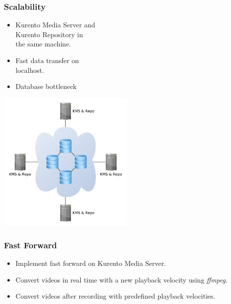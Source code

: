 \documentclass[compress]{beamer}
\begin{document}
	\begin{frame}[c]
		\frametitle{Scalability}
		\begin{itemize}
				\vfill
		\item Kurento Media Server and \\ Kurento Repository in \\the same machine. 
				\vfill
		\item Fast data transfer on \\ localhost.
				\vfill
		\item Database bottleneck
		\end{itemize}

		\begin{flushright}
			\vspace*{-12\baselineskip}
			\includegraphics[width=0.5\textwidth]{figures/scale2.pdf}
		\end{flushright}
	


	\end{frame}

	\begin{frame}[c]
		\frametitle{Fast Forward}
		\begin{itemize}
				\vfill
		\item Implement fast forward on Kurento Media Server.
				\vfill
		\item Convert videos in real time with a new playback velocity using \emph{ffmpeg}.
				\vfill
		\item Convert videos after recording with predefined playback velocities.
		\end{itemize}


	\end{frame}
\end{document}
